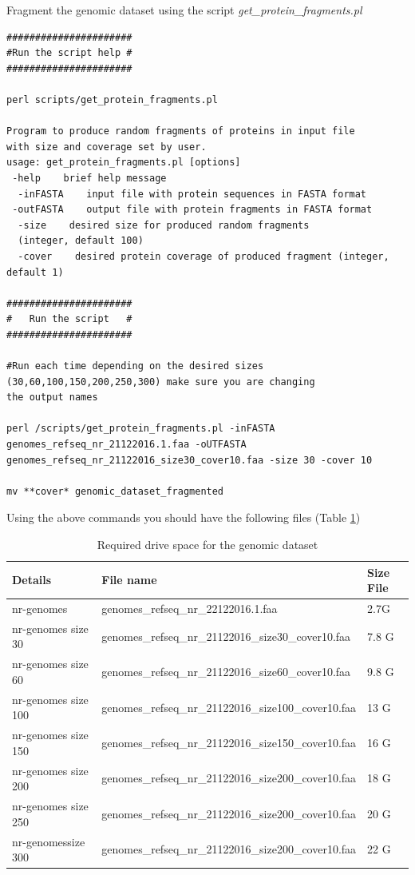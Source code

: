 \documentclass[a4paper,11pt]{report}
\begin{document}
Fragment the genomic dataset using the script \textit{get\_protein\_fragments.pl}

\begin{verbatim}
######################
#Run the script help #
######################

perl scripts/get_protein_fragments.pl 

Program to produce random fragments of proteins in input file 
with size and coverage set by user.
usage: get_protein_fragments.pl [options] 
 -help    brief help message
  -inFASTA    input file with protein sequences in FASTA format
 -outFASTA    output file with protein fragments in FASTA format
  -size    desired size for produced random fragments    
  (integer, default 100)
  -cover    desired protein coverage of produced fragment (integer, default 1) 

######################
#   Run the script   #
######################

#Run each time depending on the desired sizes 
(30,60,100,150,200,250,300) make sure you are changing 
the output names

perl /scripts/get_protein_fragments.pl -inFASTA 
genomes_refseq_nr_21122016.1.faa -oUTFASTA 
genomes_refseq_nr_21122016_size30_cover10.faa -size 30 -cover 10 

mv **cover* genomic_dataset_fragmented

\end{verbatim}

Using the above commands you should have the following files (Table \ref{sizes}) 

\begin{table}[H]
\centering
\caption{Required drive space for the genomic dataset}
\label{sizes}
\begin{tabular}{@{}lll@{}}
\toprule
Details             & File name                                           & Size File \\ \midrule
nr-genomes          & genomes\_refseq\_nr\_22122016.1.faa                 & 2.7G      \\
nr-genomes size 30  & genomes\_refseq\_nr\_21122016\_size30\_cover10.faa  & 7.8 G     \\
nr-genomes size 60  & genomes\_refseq\_nr\_21122016\_size60\_cover10.faa  & 9.8 G     \\
nr-genomes size 100 & genomes\_refseq\_nr\_21122016\_size100\_cover10.faa & 13 G      \\
nr-genomes size 150 & genomes\_refseq\_nr\_21122016\_size150\_cover10.faa & 16 G      \\
nr-genomes size 200 & genomes\_refseq\_nr\_21122016\_size200\_cover10.faa & 18 G      \\
nr-genomes size 250 & genomes\_refseq\_nr\_21122016\_size200\_cover10.faa & 20 G      \\
nr-genomessize 300  & genomes\_refseq\_nr\_21122016\_size200\_cover10.faa & 22 G      \\ \bottomrule
\end{tabular}
\end{table}
\end{document}
